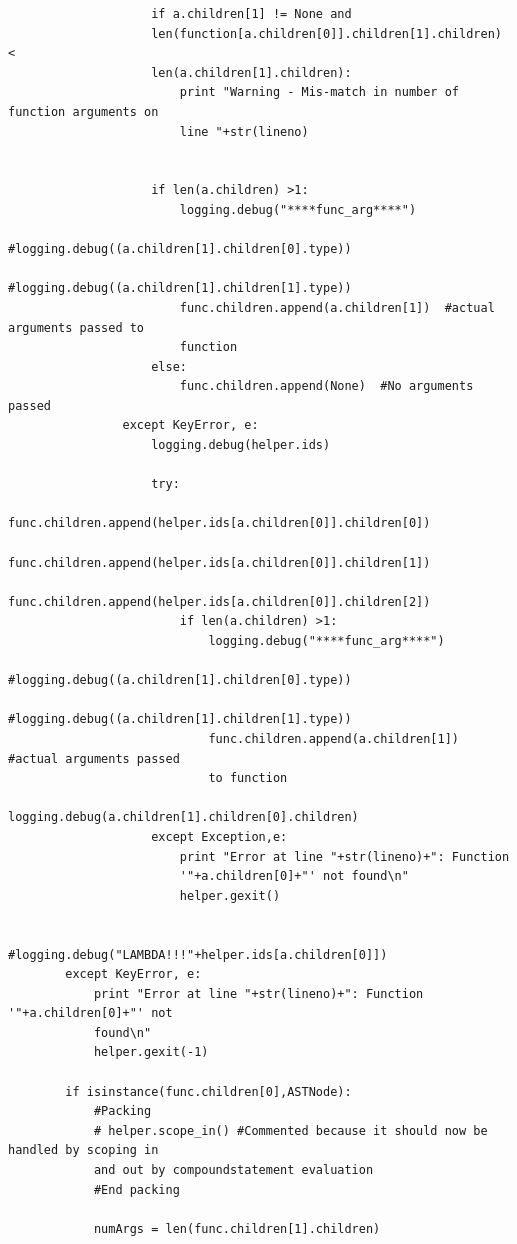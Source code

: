 \documentclass[a4paper]{article}
\begin{document}
\begin{verbatim}
                    if a.children[1] != None and 
                    len(function[a.children[0]].children[1].children) < 
                    len(a.children[1].children):
                        print "Warning - Mis-match in number of function arguments on 
                        line "+str(lineno)
    

                    if len(a.children) >1:
                        logging.debug("****func_arg****")
                        #logging.debug((a.children[1].children[0].type))
                        #logging.debug((a.children[1].children[1].type))
                        func.children.append(a.children[1])  #actual arguments passed to 
                        function
                    else:
                        func.children.append(None)  #No arguments passed
                except KeyError, e:
                    logging.debug(helper.ids)

                    try:
                        func.children.append(helper.ids[a.children[0]].children[0])    
                        func.children.append(helper.ids[a.children[0]].children[1])    
                        func.children.append(helper.ids[a.children[0]].children[2])    
                        if len(a.children) >1:
                            logging.debug("****func_arg****")
                            #logging.debug((a.children[1].children[0].type))
                            #logging.debug((a.children[1].children[1].type))
                            func.children.append(a.children[1])  #actual arguments passed 
                            to function
                            logging.debug(a.children[1].children[0].children)
                    except Exception,e:
                        print "Error at line "+str(lineno)+": Function 
                        '"+a.children[0]+"' not found\n"
                        helper.gexit()

                    #logging.debug("LAMBDA!!!"+helper.ids[a.children[0]])
        except KeyError, e:
            print "Error at line "+str(lineno)+": Function '"+a.children[0]+"' not 
            found\n"
            helper.gexit(-1)

        if isinstance(func.children[0],ASTNode):
            #Packing
            # helper.scope_in() #Commented because it should now be handled by scoping in 
            and out by compoundstatement evaluation
            #End packing
            
            numArgs = len(func.children[1].children)
            

\end{verbatim}
\end{document}
